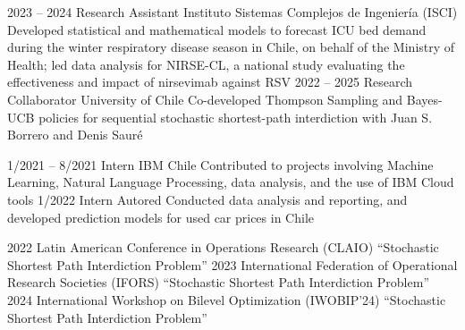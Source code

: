 \documentclass[10pt]{developercv} %
\begin{document}
\vspace{-10pt}
\begin{entrylist}
    \entry
        {2023 -- 2024}
		{Research Assistant}
		{Instituto Sistemas Complejos de Ingeniería (ISCI)}
		{Developed statistical and mathematical models to forecast ICU bed demand during the winter respiratory disease season in Chile, on behalf of the Ministry of Health; led data analysis for NIRSE-CL, a national study evaluating the effectiveness and impact of nirsevimab against RSV}
    \entry
		{2022 -- 2025}
		{Research Collaborator}
		{University of Chile}
		{Co-developed Thompson Sampling and Bayes-UCB policies for sequential stochastic shortest-path interdiction with Juan S. Borrero and Denis Sauré}
\end{entrylist}

\vspace{-10pt}
\begin{entrylist}
	\entry
		{1/2021 -- 8/2021}
		{Intern}
		{IBM Chile}
		{Contributed to projects involving Machine Learning, Natural Language Processing, data analysis, and the use of IBM Cloud tools}
	\entry
		{1/2022}
		{Intern}
		{Autored}
		{Conducted data analysis and reporting, and developed prediction models for used car prices in Chile}
\end{entrylist}

\vspace{-10pt}
\begin{entrylist}
	\entry
        {2022}
		{Latin American Conference in Operations Research (CLAIO)}
		{}
		{``Stochastic Shortest Path Interdiction Problem''}
	\entry
        {2023}
		{International Federation of Operational Research Societies (IFORS)}
		{}
		{``Stochastic Shortest Path Interdiction Problem''}
  	\entry
        {2024}
		{International Workshop on Bilevel Optimization (IWOBIP'24)}
		{}
		{``Stochastic Shortest Path Interdiction Problem''}
\end{entrylist}
\end{document}

